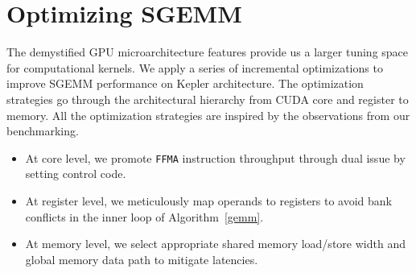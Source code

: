 \section{Optimizing SGEMM}
\label{sec:optimization}


The demystified GPU microarchitecture features provide us a larger tuning space for computational kernels.
We apply
a series of incremental optimizations to improve SGEMM performance on Kepler architecture. The optimization strategies
go through the architectural hierarchy from CUDA core and register to memory. All the optimization strategies are
inspired by the observations from our benchmarking.
\begin{itemize}
\item At core level, we promote {\tt FFMA} instruction throughput through dual issue by setting control code.
\item At register level, we meticulously map operands to registers to avoid bank conflicts in the inner loop of Algorithm~\ref{gemm}.
\item At memory level, we select appropriate shared memory load/store width and global memory data path to mitigate
latencies.
\end{itemize}




